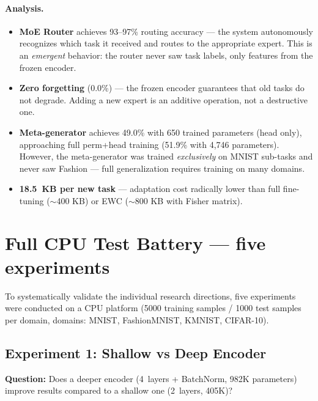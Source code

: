 \documentclass[11pt,a4paper]{report}
\begin{document}
\paragraph{Analysis.}
\begin{itemize}
    \item \textbf{MoE Router} achieves 93--97\% routing accuracy --- the system autonomously recognizes
          which task it received and routes to the appropriate expert. This is an
          \emph{emergent} behavior: the router never saw task labels, only features from the frozen encoder.
    \item \textbf{Zero forgetting} (0.0\%) --- the frozen encoder guarantees that old tasks
          do not degrade. Adding a new expert is an additive operation, not a destructive one.
    \item \textbf{Meta-generator} achieves 49.0\% with 650 trained parameters (head only),
          approaching full perm+head training (51.9\% with 4,746 parameters).
          However, the meta-generator was trained \emph{exclusively} on MNIST sub-tasks
          and never saw Fashion --- full generalization requires training on many domains.
    \item \textbf{18.5~KB per new task} --- adaptation cost radically lower than
          full fine-tuning ($\sim$400 KB) or EWC ($\sim$800 KB with Fisher matrix).
\end{itemize}


\section{Full CPU Test Battery --- five experiments}
\label{sec:cpu_full}

To systematically validate the individual research directions, five experiments were conducted
on a CPU platform (5000 training samples / 1000 test samples per domain,
domains: MNIST, FashionMNIST, KMNIST, CIFAR-10).

\subsection{Experiment 1: Shallow vs Deep Encoder}

\textbf{Question:} Does a deeper encoder (4~layers + BatchNorm, 982K parameters) improve results
compared to a shallow one (2~layers, 405K)?
\end{document}
